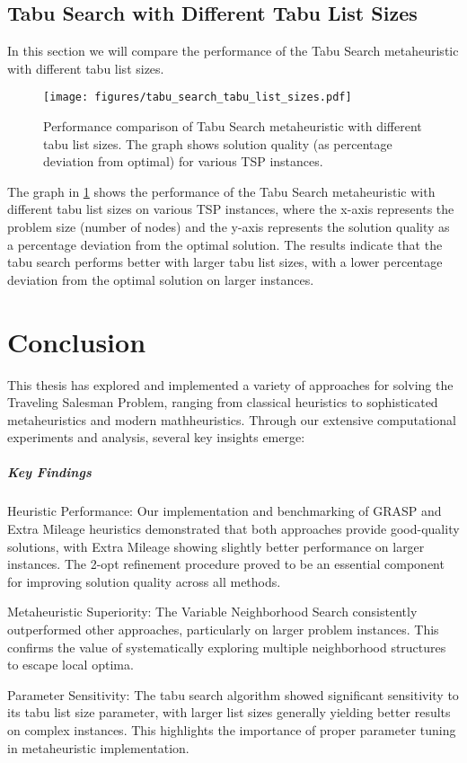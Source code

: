\documentclass{article}
\begin{document}
\subsection{Tabu Search with Different Tabu List Sizes}
In this section we will compare the performance of the Tabu Search metaheuristic with different tabu list sizes.
\begin{figure}[ht]
	\centering
	\texttt{[image: figures/tabu\_search\_tabu\_list\_sizes.pdf]}
	\caption{Performance comparison of Tabu Search metaheuristic with different tabu list sizes. The graph shows solution quality (as percentage deviation from optimal) for various TSP instances.}
	\label{fig:tabu_search_tabu_list_sizes}
\end{figure}
The graph in \ref{fig:tabu_search_tabu_list_sizes} shows the performance of the Tabu Search metaheuristic with different tabu list sizes on various TSP instances, 
where the x-axis represents the problem size (number of nodes) and the y-axis represents the solution quality as a percentage deviation from the optimal solution.
The results indicate that the tabu search performs better with larger tabu list sizes, with a lower percentage deviation from the optimal solution on larger instances.
\newpage
\section{Conclusion}
This thesis has explored and implemented a variety of approaches for solving the Traveling Salesman Problem, ranging from classical heuristics to sophisticated metaheuristics and modern mathheuristics. Through our extensive computational experiments and analysis, several key insights emerge:

\subparagraph{Key Findings}
Heuristic Performance: Our implementation and benchmarking of GRASP and Extra Mileage heuristics demonstrated that both approaches provide good-quality solutions, with Extra Mileage showing slightly better performance on larger instances. The 2-opt refinement procedure proved to be an essential component for improving solution quality across all methods.

Metaheuristic Superiority: The Variable Neighborhood Search consistently outperformed other approaches, particularly on larger problem instances. This confirms the value of systematically exploring multiple neighborhood structures to escape local optima.

Parameter Sensitivity: The tabu search algorithm showed significant sensitivity to its tabu list size parameter, with larger list sizes generally yielding better results on complex instances. This highlights the importance of proper parameter tuning in metaheuristic implementation.
\end{document}
